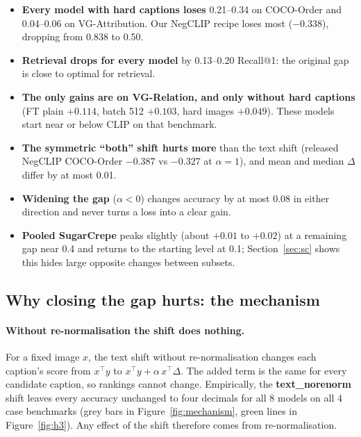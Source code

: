 \documentclass[11pt,a4paper]{article}
\newcommand{\gapv}{\Delta}
\begin{document}
\begin{itemize}
\item \textbf{Every model with hard captions loses} 0.21--0.34 on COCO-Order and 0.04--0.06 on
VG-Attribution. Our NegCLIP recipe loses most ($-0.338$), dropping from 0.838 to 0.50.
\item \textbf{Retrieval drops for every model} by 0.13--0.20 Recall@1: the original gap is close to
optimal for retrieval.
\item \textbf{The only gains are on VG-Relation, and only without hard captions} (FT plain $+0.114$,
batch 512 $+0.103$, hard images $+0.049$). These models start near or below CLIP on that benchmark.
\item \textbf{The symmetric ``both'' shift hurts more} than the text shift
(released NegCLIP COCO-Order $-0.387$ vs $-0.327$ at $\alpha=1$), and mean and median $\gapv$ differ by at most 0.01.
\item \textbf{Widening the gap} ($\alpha<0$) changes accuracy by at most 0.08 in either direction and never turns a loss into a clear gain.
\item \textbf{Pooled SugarCrepe} peaks slightly (about $+0.01$ to $+0.02$) at a remaining gap near 0.4 and returns to the starting level at 0.1; Section~\ref{sec:sc} shows this hides large opposite changes between subsets.
\end{itemize}

\subsection{Why closing the gap hurts: the mechanism}

\paragraph{Without re-normalisation the shift does nothing.}
For a fixed image $x$, the text shift without re-normalisation changes each caption's score from
$x^\top y$ to $x^\top y+\alpha\,x^\top\gapv$. The added term is the same for every candidate caption, so
rankings cannot change. Empirically, the \textbf{text\_norenorm} shift leaves every accuracy unchanged to
four decimals for all 8 models on all 4 case benchmarks (grey bars in Figure~\ref{fig:mechanism}, green
lines in Figure~\ref{fig:h3}). Any effect of the shift therefore comes from re-normalisation.
\end{document}
